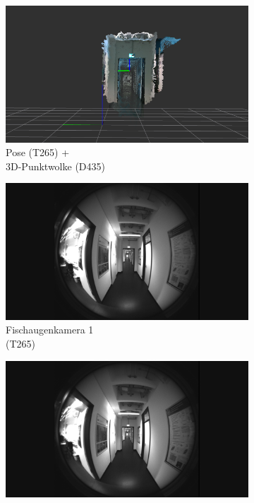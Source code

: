 \begin{figure}
	\centering
	\begin{subfigure}[t]{0.3\linewidth}
		\centering
		\includegraphics[width=\linewidth]{images/real_dataset/pointcloud3.png}
		\caption{Pose (T265) + \\ 3D-Punktwolke (D435)}
		\label{subfig:odom1}
	\end{subfigure}
	\hfill
	\begin{subfigure}[t]{0.3\linewidth}
		\centering
		\includegraphics[width=\linewidth]{images/real_dataset/f1_frame000005.png}
		\caption{Fischaugenkamera 1 \\ (T265)}
		\label{subfig:fisheye1}
	\end{subfigure}
	\hfill
	\begin{subfigure}[t]{0.3\linewidth}
		\centering
		\includegraphics[width=\linewidth]{images/real_dataset/f2_frame000005.png}

\end{subfigure}
\end{figure}
